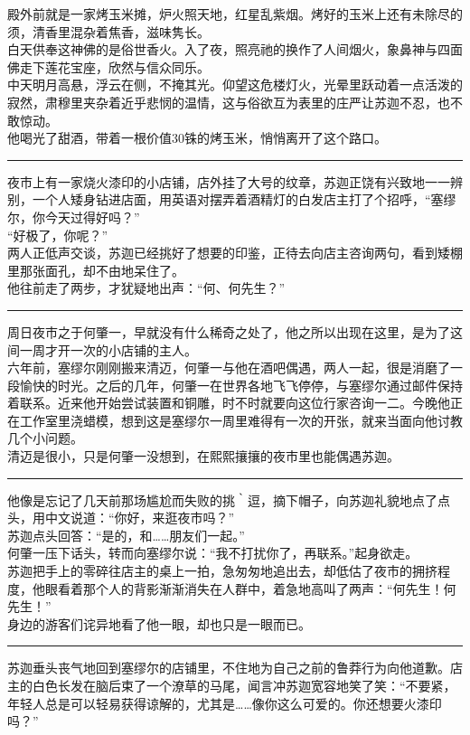 \documentclass[oneside,11pt]{memoir} %
\begin{document}
\begin{CJK}{UTF8}{gbsn}
    殿外前就是一家烤玉米摊，炉火照天地，红星乱紫烟。烤好的玉米上还有未除尽的须，清香里混杂着焦香，滋味隽长。\\\indent
    白天供奉这神佛的是俗世香火。入了夜，照亮祂的换作了人间烟火，象鼻神与四面佛走下莲花宝座，欣然与信众同乐。\\\indent
    中天明月高悬，浮云在侧，不掩其光。仰望这危楼灯火，光晕里跃动着一点活泼的寂然，肃穆里夹杂着近乎悲悯的温情，这与俗欲互为表里的庄严让苏迦不忍，也不敢惊动。\\\indent
    他喝光了甜酒，带着一根价值30铢的烤玉米，悄悄离开了这个路口。\\\indent
  \rule{-3pt}{30pt}
    夜市上有一家烧火漆印的小店铺，店外挂了大号的纹章，苏迦正饶有兴致地一一辨别，一个人矮身钻进店面，用英语对摆弄着酒精灯的白发店主打了个招呼，“塞缪尔，你今天过得好吗？”\\\indent
    “好极了，你呢？”\\\indent
    两人正低声交谈，苏迦已经挑好了想要的印鉴，正待去向店主咨询两句，看到矮棚里那张面孔，却不由地呆住了。\\\indent
    他往前走了两步，才犹疑地出声：“何、何先生？”\\\indent
  \rule{-3pt}{30pt}
    周日夜市之于何肇一，早就没有什么稀奇之处了，他之所以出现在这里，是为了这间一周才开一次的小店铺的主人。\\\indent
    六年前，塞缪尔刚刚搬来清迈，何肇一与他在酒吧偶遇，两人一起，很是消磨了一段愉快的时光。之后的几年，何肇一在世界各地飞飞停停，与塞缪尔通过邮件保持着联系。近来他开始尝试装置和铜雕，时不时就要向这位行家咨询一二。今晚他正在工作室里浇蜡模，想到这是塞缪尔一周里难得有一次的开张，就来当面向他讨教几个小问题。\\\indent
    清迈是很小，只是何肇一没想到，在熙熙攘攘的夜市里也能偶遇苏迦。\\\indent
  \rule{-3pt}{30pt}
    他像是忘记了几天前那场尴尬而失败的挑｀逗，摘下帽子，向苏迦礼貌地点了点头，用中文说道：“你好，来逛夜市吗？”\\\indent
    苏迦点头回答：“是的，和……朋友们一起。”\\\indent
    何肇一压下话头，转而向塞缪尔说：“我不打扰你了，再联系。”起身欲走。\\\indent
    苏迦把手上的零碎往店主的桌上一拍，急匆匆地追出去，却低估了夜市的拥挤程度，他眼看着那个人的背影渐渐消失在人群中，着急地高叫了两声：“何先生！何先生！”\\\indent
    身边的游客们诧异地看了他一眼，却也只是一眼而已。\\\indent
  \rule{-3pt}{30pt}
    苏迦垂头丧气地回到塞缪尔的店铺里，不住地为自己之前的鲁莽行为向他道歉。店主的白色长发在脑后束了一个潦草的马尾，闻言冲苏迦宽容地笑了笑：“不要紧，年轻人总是可以轻易获得谅解的，尤其是……像你这么可爱的。你还想要火漆印吗？”\\\indent

\end{CJK}
\end{document}
